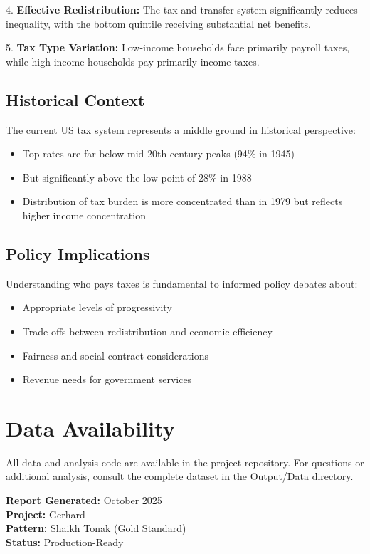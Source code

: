 \documentclass[11pt,letterpaper]{article}
\begin{document}
4. \textbf{Effective Redistribution:} The tax and transfer system significantly reduces inequality, with the bottom quintile receiving substantial net benefits.

5. \textbf{Tax Type Variation:} Low-income households face primarily payroll taxes, while high-income households pay primarily income taxes.

\subsection{Historical Context}

The current US tax system represents a middle ground in historical perspective:
\begin{itemize}
    \item Top rates are far below mid-20th century peaks (94\% in 1945)
    \item But significantly above the low point of 28\% in 1988
    \item Distribution of tax burden is more concentrated than in 1979 but reflects higher income concentration
\end{itemize}

\subsection{Policy Implications}

Understanding who pays taxes is fundamental to informed policy debates about:
\begin{itemize}
    \item Appropriate levels of progressivity
    \item Trade-offs between redistribution and economic efficiency
    \item Fairness and social contract considerations
    \item Revenue needs for government services
\end{itemize}

\newpage

\section*{Data Availability}

All data and analysis code are available in the project repository. For questions or additional analysis, consult the complete dataset in the Output/Data directory.

\vspace{1cm}

\noindent\textbf{Report Generated:} October 2025\\
\textbf{Project:} Gerhard\\
\textbf{Pattern:} Shaikh Tonak (Gold Standard)\\
\textbf{Status:} Production-Ready
\end{document}
